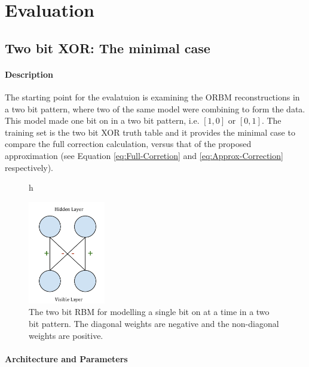\chapter{Evaluation}

\section{Two bit XOR: The minimal case}\label{S:XOR}

\subsubsection{Description}

The starting point for the evalatuion is examining the ORBM reconstructions in a two bit pattern, where two of the same model were combining to form the data. This model made one bit on in a two bit pattern, i.e. $[1 , 0]$ or $[0 , 1]$. The training set is the two bit XOR truth table and it provides the minimal case to compare the full correction calculation, versus that of the proposed approximation (see Equation \ref{eq:Full-Corretion} and \ref{eq:Approx-Correction} respectively).

\begin{figure}{h}
  \begin{center}
    \includegraphics[width=0.3\textwidth]{Assets/Two-Bit-RBM.png}
  \end{center}
  \caption{The two bit RBM for modelling a single bit on at a time in a two bit pattern. The diagonal weights are negative and the non-diagonal weights are positive.}
  \label{F:Two-Bit-RBM}
\end{figure}

\subsubsection{Architecture and Parameters}

